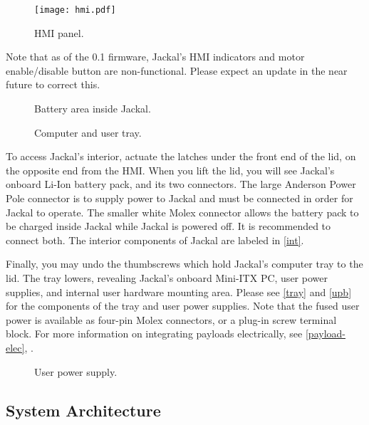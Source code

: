 \documentclass[]{clearpath-latex/clearpath-manual}
\begin{document}
\begin{figure}[ht]
  \centering
  \texttt{[image: hmi.pdf]}
  \caption{HMI panel.}
  \label{hmi}
\end{figure}

\begin{warning}
Note that as of the 0.1 firmware, Jackal's HMI indicators and motor enable/disable button are
non-functional. Please expect an update in the near future to correct this.
\end{warning}

\begin{figure}[pt]
  \centering
  \def\svgwidth{12cm}
  
  \caption{Battery area inside Jackal.}
  \label{int}
\end{figure}

\begin{figure}[pb]
  \centering
  \def\svgwidth{14cm}
  
  \caption{Computer and user tray.}
  \label{tray}
\end{figure}

To access Jackal's interior, actuate the latches under the front end of the lid, on the opposite end from
the HMI. When you lift the lid, you will see Jackal's onboard Li-Ion battery pack, and its two connectors.
The large Anderson Power Pole connector is to supply power to Jackal and must be connected in order for
Jackal to operate. The smaller white Molex connector allows the battery pack to be charged inside Jackal 
while Jackal is powered off. It is recommended to connect both. The interior components of Jackal are
labeled in \autoref{int}.

Finally, you may undo the thumbscrews which hold Jackal's computer tray to the lid. The tray lowers,
revealing Jackal's onboard Mini-ITX PC, user power supplies, and internal user hardware mounting area.
Please see \autoref{tray} and \autoref{upb} for the components of the tray and user power supplies.
Note that the fused user power is available as four-pin Molex connectors, or a plug-in screw terminal
block. For more information on integrating payloads electrically, see \autoref{payload-elec},
.

\begin{figure}[hb]
  \centering
  \def\svgwidth{15cm}
  
  \caption{User power supply.}
  \label{upb}
\end{figure}

\subsection{System Architecture}
\end{document}
